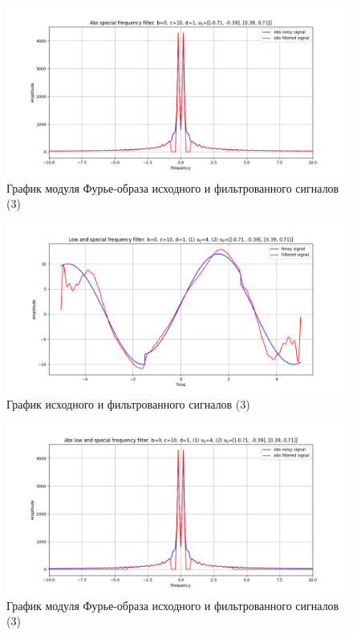 \documentclass[a4paper, 12pt]{article}
\begin{document}
    \begin{figure}[!htb]
        \centering
        \includegraphics[scale=0.48]{3_abs_u_U_nospec.png}
        \captionsetup{skip=0pt}
        \caption{График модуля Фурье-образа исходного и фильтрованного сигналов (3)}
        \label{fig:fig92}
    \end{figure}
    \begin{figure}[!htb]
        \centering
        \includegraphics[scale=0.48]{3_3_u_flt_u_nospec.png}
        \captionsetup{skip=0pt}
        \caption{График исходного и фильтрованного сигналов (3)}
        \label{fig:fig97}
    \end{figure}
    \begin{figure}[!htb]
        \centering
        \includegraphics[scale=0.48]{3_3_abs_u_U_nospec.png}
        \captionsetup{skip=0pt}
        \caption{График модуля Фурье-образа исходного и фильтрованного сигналов (3)}
        \label{fig:fig98}
    \end{figure}
\end{document}
